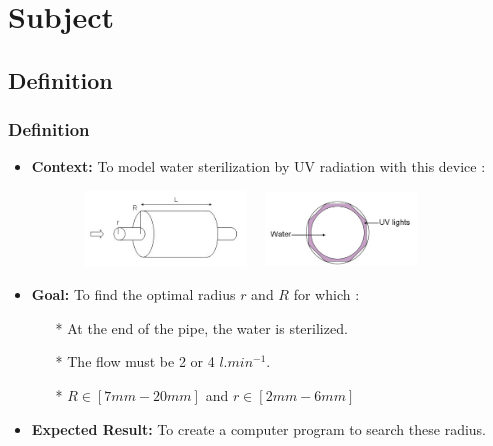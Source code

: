 

  \section{Subject}

  \subsection{Definition}

  \begin{frame}
          \frametitle{Definition}
  \begin{itemize}[<+->]
  \item \textbf{Context:} To model water sterilization by UV radiation with this device :
          \begin{figure}
                  \raggedleft
                  \includegraphics[width=5cm,height=2cm]{./images/sterilisateurh.jpg}
                  \hspace{3mm}
                  \raggedright
                  \includegraphics[width=4cm,height=2cm]{./images/coupeSterilisateur.jpg}
          \end{figure}
  \item \textbf{Goal:} To find the optimal radius $r$ and $R$ for which :
          \begin{itemize} 
                  \item[*] At the end of the pipe, the water is sterilized.
                  \item[*] The flow must be 2 or 4 $l.min^{-1}$.
                  \item[*] $R \in [7mm - 20mm]$ and $r \in [2mm - 6mm]$
          \end{itemize}
  \item \textbf{Expected Result:} To create a computer program to search these radius.
  \end{itemize}
  \end{frame}

